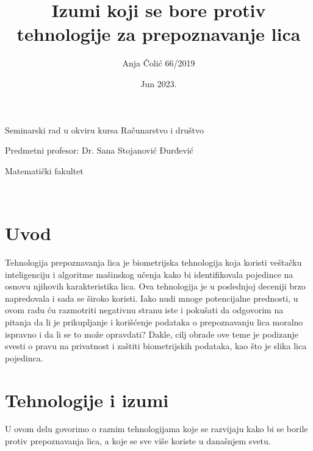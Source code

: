 \documentclass{article}
\title{Izumi koji se bore protiv tehnologije za prepoznavanje lica}
\author{Anja Čolić 66/2019}
\date{Jun 2023.}
\newcommand{\profesor}{Predmetni profesor: Dr. Sana Stojanović Đurđević}
\newcommand{\fakultet}{Matematički fakultet}
\newcommand{\kurs}{Seminarski rad u okviru kursa Računarstvo i društvo}
\begin{document}

\maketitle


\begin{center}
\kurs
\end{center}
\begin{center}
\profesor
\end{center}
\begin{center}
\fakultet
\end{center}


\newpage
{}
\renewcommand{\contentsname}{Sadržaj}
\tableofcontents
\newpage

\





\maketitle

\section{Uvod}

Tehnologija prepoznavanja lica je biometrijska tehnologija koja koristi veštačku inteligenciju i algoritme mašinskog učenja kako bi identifikovala pojedince na osnovu njihovih karakteristika lica. 
\newline
\newline
Ova tehnologija je u poslednjoj deceniji brzo napredovala i sada se široko koristi.
Iako nudi mnoge potencijalne prednosti, u ovom radu ću razmotriti negativnu stranu iste i pokušati da odgovorim na pitanja da li je prikupljanje i korišćenje podataka o prepoznavanju lica moralno ispravno i da li se to može opravdati?
\newline
\newline
Dakle, cilj obrade ove teme je podizanje svesti o pravu na privatnost i zaštiti biometrijskih podataka, kao što je slika lica pojedinca.
\newpage

\section{Tehnologije i izumi}

U ovom delu govorimo o raznim tehnologijama koje se razvijaju kako bi se borile protiv prepoznavanja lica, a koje se sve više koriste u današnjem svetu. 
\end{document}
